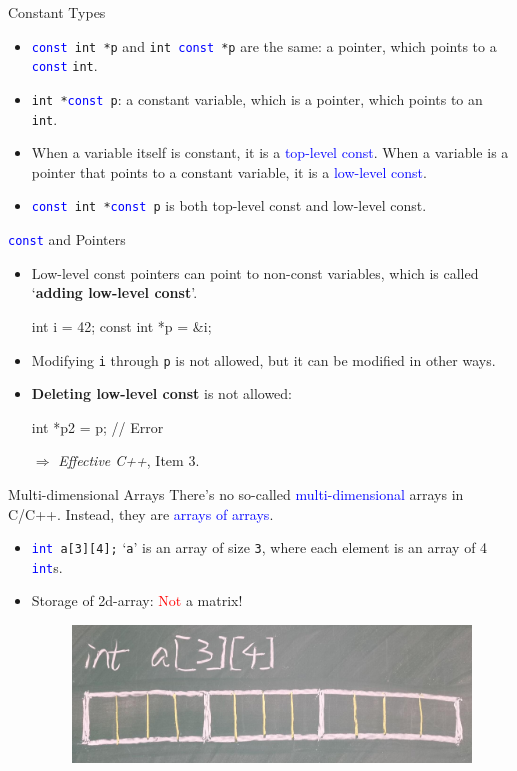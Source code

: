 \documentclass[handout]{beamer}
\newcommand{\red}[1]{\textcolor{red}{#1}}
\newcommand{\blue}[1]{\textcolor{blue}{#1}}
\newcommand{\ttt}[1]{\texttt{#1}}
\newcommand{\bluett}[1]{\blue{\ttt{#1}}}
\begin{document}
\begin{frame}{Constant Types}
	\begin{itemize}
		\item \bluett{const }\ttt{int *p} and \ttt{int }\bluett{const }\ttt{*p} are the same: a pointer, which points to a \bluett{const} \ttt{int}.
		\item \ttt{int *}\bluett{const }\ttt{p}: a constant variable, which is a pointer, which points to an \ttt{int}.
		\pause
		\item When a variable itself is constant, it is a \blue{top-level const}. When a variable is a pointer that points to a constant variable, it is a \blue{low-level const}.
		\item \bluett{const }\ttt{int *}\bluett{const }\ttt{p} is both top-level const and low-level const.
	\end{itemize}
\end{frame}

\begin{frame}[fragile]{\bluett{const} and Pointers}
	\begin{itemize}
		\item Low-level const pointers can point to non-const variables, which is called `\textbf{adding low-level const}'.
		\begin{cpp}
int i = 42;
const int *p = &i;
		\end{cpp}
		\item Modifying \ttt{i} through \ttt{p} is not allowed, but it can be modified in other ways.
		\pause
		\item \textbf{Deleting low-level const} is not allowed:
		\begin{cpp}
int *p2 = p; // Error
		\end{cpp}
		\pause
		\item[\(\Rightarrow\)] \textit{Effective C++}, Item 3.
	\end{itemize}
\end{frame}

\begin{frame}{Multi-dimensional Arrays}
	There's no so-called \blue{multi-dimensional} arrays in C/C++. Instead, they are \blue{arrays of arrays}.
	\begin{itemize}
		\item \bluett{int }\ttt{a[3][4];} `\ttt{a}' is an array of size \ttt{3}, where each element is an array of 4 \bluett{int}s.
		\pause
		\item Storage of 2d-array: \red{Not} a matrix!
		\begin{figure}[h]
			\centering
			\includegraphics[scale=0.2]{figures/2darray.jpg}
		\end{figure}
	\end{itemize}
\end{frame}
\end{document}
